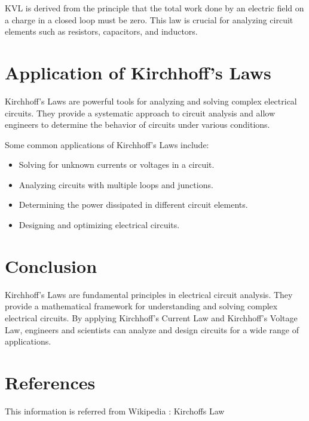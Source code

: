 \documentclass{article}
\begin{document}
KVL is derived from the principle that the total work done by an electric field on a charge in a closed loop must be zero. This law is crucial for analyzing circuit elements such as resistors, capacitors, and inductors.

\section{Application of Kirchhoff's Laws}
Kirchhoff's Laws are powerful tools for analyzing and solving complex electrical circuits. They provide a systematic approach to circuit analysis and allow engineers to determine the behavior of circuits under various conditions.

Some common applications of Kirchhoff's Laws include:
\begin{itemize}
\item Solving for unknown currents or voltages in a circuit.
\item Analyzing circuits with multiple loops and junctions.
\item Determining the power dissipated in different circuit elements.
\item Designing and optimizing electrical circuits.
\end{itemize}

\section{Conclusion}
Kirchhoff's Laws are fundamental principles in electrical circuit analysis. They provide a mathematical framework for understanding and solving complex electrical circuits. By applying Kirchhoff's Current Law and Kirchhoff's Voltage Law, engineers and scientists can analyze and design circuits for a wide range of applications.

\section{References}
This information is referred from Wikipedia : Kirchoffs Law



\end{document}
